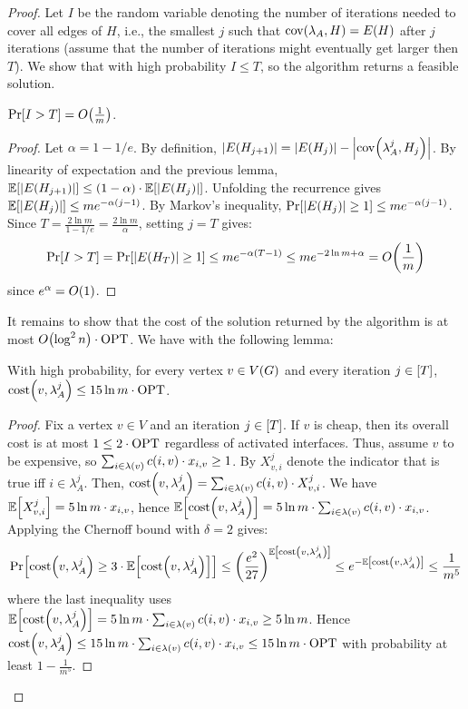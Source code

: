 \begin{proof}
Let $I$ be the random variable denoting the number of iterations needed to cover all edges of $H$, i.e., the smallest $j$ such that $\cov\br{\lambda_A, H} = E\br{H}$ after $j$ iterations (assume that the number of iterations might eventually get larger then $T$). We show that with high probability $I \leq T$, so the algorithm returns a feasible solution.
\begin{lemma}
    \label{lem:expected-iterations}
    $\Pr\sbr{I > T} = O\br{\frac{1}{m}}$.
\end{lemma}
\begin{proof}
    Let $\alpha = 1-1/e$. By definition, $\spr{E\br{H_{j+1}}}=\spr{E\br{H_{j}}}-\spr{\cov\br{\lambda_A^j, H_j}}$. By linearity of expectation and the previous lemma, $\mathbb{E}\sbr{\spr{E\br{H_{j+1}}}} \leq \br{1-\alpha}\cdot \mathbb{E}\sbr{\spr{E\br{H_{j}}}}$. Unfolding the recurrence gives $\mathbb{E}\sbr{\spr{E\br{H_{j}}}} \leq m e^{-\alpha(j-1)}$. By Markov's inequality, $\Pr\sbr{\spr{E\br{H_{j}}}\geq 1} \leq m e^{-\alpha(j-1)}$. Since $T = \frac{2\ln m}{1-1/e} = \frac{2\ln m}{\alpha}$, setting $j = T$ gives:
    $$\Pr\sbr{I > T} = \Pr\sbr{\spr{E\br{H_{T}}}\geq 1} \leq m e^{-\alpha(T-1)} \leq m e^{-2\ln m+\alpha} = O\br{\frac{1}{m}}$$
    since $e^{\alpha}=O\br{1}$.
\end{proof}

It remains to show that the cost of the solution returned by the algorithm is at most $O\br{\log^2 n}\cdot \OPT$. We have with the following lemma:
\begin{lemma}
    With high probability, for every vertex $v\in V\br{G}$ and every iteration $j \in \sbr{T}$, $\COST\br{v, \lambda_A^j} \leq 15\ln m \cdot \OPT$.
\end{lemma}
\begin{proof}
Fix a vertex $v\in V$ and an iteration $j\in\sbr{T}$. If $v$ is cheap, then its overall cost is at most $1\leq 2\cdot\OPT$ regardless of activated interfaces. Thus, assume $v$ to be expensive, so $\sum_{i\in\lambda\br{v}}c\br{i,v} \cdot x_{i,v} \geq 1$.
By $X_{v,i}^j$ denote the indicator that is true iff $i\in \lambda_A^j$. Then, $\COST\br{v, \lambda_A^j} = \sum_{i\in\lambda\br{v}}c\br{i,v} \cdot X_{v,i}^j $. We have $\mathbb{E}\sbr{X_{v,i}^j} = 5\ln m\cdot x_{i,v}$, hence $\mathbb{E}\sbr{\COST\br{v,\lambda_A^j}} = 5\ln m\cdot \sum_{i\in\lambda\br{v}}c\br{i,v} \cdot x_{i,v}$. Applying the Chernoff bound with $\delta=2$ gives:
\begin{align*}
    \Pr\sbr{\COST\br{v, \lambda_A^j} \geq 3\cdot\mathbb{E}\sbr{\COST\br{v,\lambda_A^j}}}
    \leq \br{\frac{e^2}{27}}^{\mathbb{E}\sbr{\COST\br{v,\lambda_A^j}}}
    \leq e^{-\mathbb{E}\sbr{\COST\br{v,\lambda_A^j}}}
    \leq \frac{1}{m^5}
\end{align*}
where the last inequality uses $\mathbb{E}\sbr{\COST\br{v,\lambda_A^j}} = 5\ln m\cdot\sum_{i\in\lambda\br{v}}c\br{i,v} \cdot x_{i,v} \geq 5\ln m$. Hence $\COST\br{v,\lambda_A^j} \leq 15\ln m\cdot\sum_{i\in\lambda\br{v}} c\br{i,v} \cdot x_{i,v} \leq 15\ln m\cdot\OPT$ with probability at least $1-\frac{1}{m^5}$.


\end{proof}
\end{proof}
